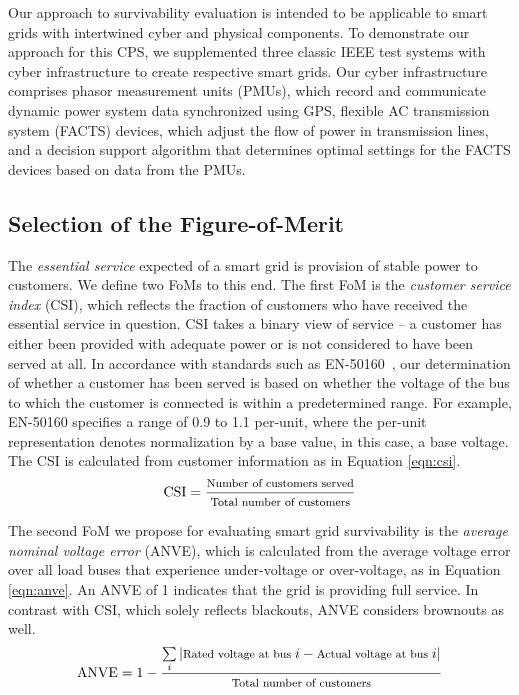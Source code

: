 \documentclass[review]{elsarticle}
\begin{document}
Our approach to survivability evaluation is intended to be applicable to smart grids with intertwined cyber and physical  components. To demonstrate our approach for this CPS, we supplemented three classic IEEE test systems with cyber infrastructure to create respective smart grids. Our cyber infrastructure comprises phasor measurement units (PMUs), which record and communicate dynamic power system data synchronized using GPS, flexible AC transmission system (FACTS) devices, which adjust the flow of power in transmission lines, and a decision support algorithm that determines optimal settings for the FACTS devices based on data from the PMUs.

\subsection{Selection of the Figure-of-Merit}
\label{sec:case_study:sel_fom}
The \emph{essential service} expected of a smart grid is provision of stable power to customers. We define two FoMs to this end. The first FoM is the \emph{customer service index} (CSI), which reflects the fraction of customers who have received the essential service in question. CSI takes a binary view of service -- a customer has either been provided with adequate power or is not considered to have been served at all. In accordance with standards such as EN-50160~\cite{EN50160}, our determination of whether a customer has been served is based on whether the voltage of the bus to which the customer is connected is within a predetermined range. For example, EN-50160 specifies a range of 0.9 to 1.1 per-unit, where the per-unit representation denotes normalization by a base value, in this case, a base voltage. The CSI is calculated from customer information as in Equation \eqref{eqn:csi}.
\begin{equation}
\label{eqn:csi}
\text{CSI}=\frac{\text{\footnotesize Number of customers served}}{\text{\footnotesize Total number of customers}}
\end{equation}

The second FoM we propose for evaluating smart grid survivability is the \emph{average nominal voltage error} (ANVE), which is calculated from the average voltage error over all load buses that experience under-voltage or over-voltage, as in Equation \eqref{eqn:anve}. An ANVE of 1 indicates that the grid is providing full service. In contrast with CSI, which solely reflects blackouts, ANVE considers brownouts as well.
\begin{equation}
\label{eqn:anve}
\text{ANVE}=1 - \frac{\sum\limits_{i}\left|\text{\footnotesize Rated voltage at bus}\;i - \text{\footnotesize Actual voltage at bus}\;i\right|}{\text{\footnotesize Total number of customers}}
\end{equation}
\end{document}
